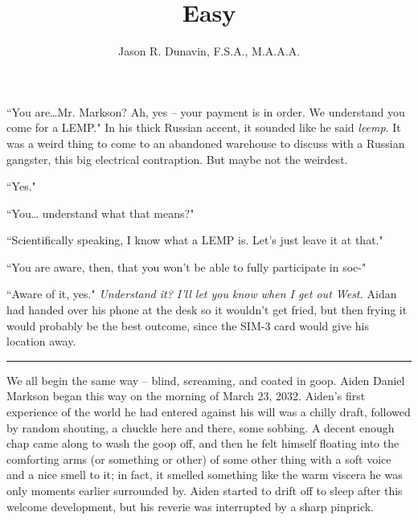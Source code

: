 \documentclass[11pt]{book}
\title{Easy}
\author{Jason R. Dunavin, F.S.A., M.A.A.A.}
\begin{document}
	\maketitle
	
	``You are\dots  Mr. Markson? Ah, yes -- your payment is in order. We understand you come for a LEMP." In his thick Russian accent, it sounded like he said \textit{leemp}. It was a weird thing to come to an abandoned warehouse to discuss with a Russian gangster, this big electrical contraption. But maybe not the weirdest.
	
	``Yes."
	
	``You… understand what that means?"
	
	``Scientifically speaking, I know what a LEMP is. Let's just leave it at that."
	
	``You are aware, then, that you won't be able to fully participate in soc-"
	
	``Aware of it, yes." \textit{Understand it? I'll let you know when I get out West.} Aidan had handed over his phone at the desk so it wouldn't get fried, but then frying it would probably be the best outcome, since the SIM-3 card would give his location away.
	
	\vspace{0.5cm}
	\hrule
	\vspace{0.5cm}
	
	We all begin the same way -- blind, screaming, and coated in goop. Aiden Daniel Markson began this way on the morning of March 23, 2032. Aiden's first experience of the world he had entered against his will was a chilly draft, followed by random shouting, a chuckle here and there, some sobbing. A decent enough chap came along to wash the goop off, and then he felt himself floating into the comforting arms (or something or other) of some other thing with a  soft voice and a nice smell to it; in fact, it smelled something like the warm viscera he was only moments earlier surrounded by. Aiden started to drift off to sleep after this welcome development, but his reverie was interrupted by a sharp pinprick.
	
\end{document}
